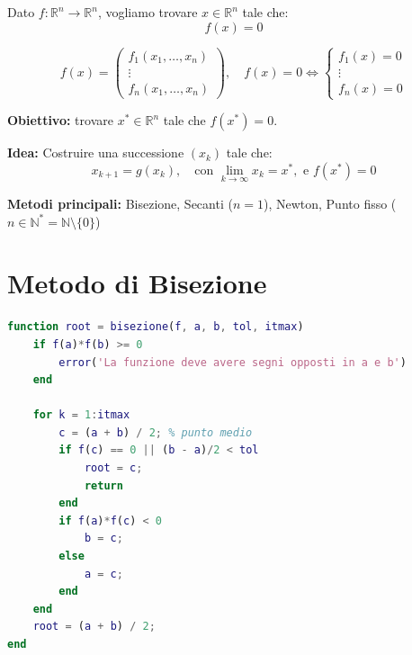 \documentclass[12pt,a4paper]{article}
\begin{document}
Dato \( f : \mathbb{R}^n \to \mathbb{R}^n \), vogliamo trovare \( x \in \mathbb{R}^n \) tale che:
\[
f(x) = 0
\]
  
\[
f(x) = \begin{pmatrix}
f_1(x_1, \dots, x_n) \\
\vdots \\
f_n(x_1, \dots, x_n)
\end{pmatrix}, \quad f(x) = 0 \iff
\begin{cases}
f_1(x) = 0 \\
\vdots \\
f_n(x) = 0
\end{cases}
\]

\textbf{Obiettivo:} trovare \( x^* \in \mathbb{R}^n \) tale che \( f(x^*) = 0 \).

\textbf{Idea:}  
Costruire una successione \( (x_k) \) tale che:
\[
x_{k+1} = g(x_k), \quad \text{con } \lim_{k \to \infty} x_k = x^*, \text{ e } f(x^*) = 0
\]

\textbf{Metodi principali:} Bisezione, Secanti (\( n = 1 \)), Newton, Punto fisso (\( n \in \mathbb{N}^*=\mathbb{N}\setminus\{0\}\))

\section*{Metodo di Bisezione}

\begin{flushleft}
\end{flushleft}

\vspace{1em}
\begin{lstlisting}[language=Matlab]
function root = bisezione(f, a, b, tol, itmax)
    if f(a)*f(b) >= 0
        error('La funzione deve avere segni opposti in a e b')
    end
    
    for k = 1:itmax
        c = (a + b) / 2; % punto medio
        if f(c) == 0 || (b - a)/2 < tol
            root = c;
            return
        end
        if f(a)*f(c) < 0
            b = c;
        else
            a = c;
        end
    end
    root = (a + b) / 2;
end
\end{lstlisting}
\end{document}
